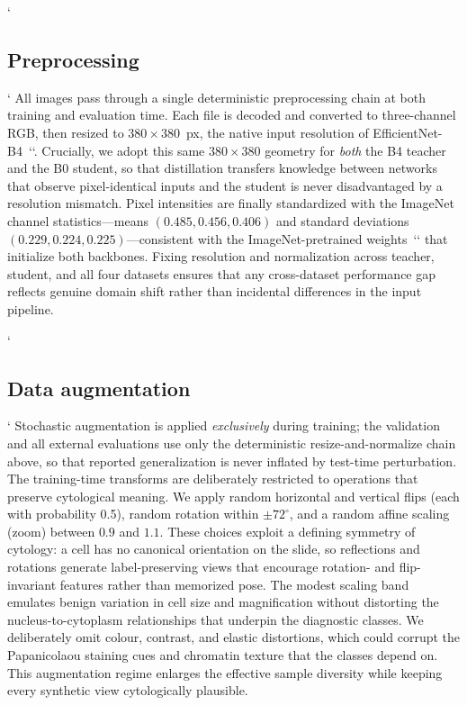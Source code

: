 `\subsection{Preprocessing}`
All images pass through a single deterministic preprocessing chain at both training and evaluation time. Each file is decoded and converted to three-channel RGB, then resized to $380\times380$~px, the native input resolution of EfficientNet-B4~`\citep{tan2019efficientnet}`. Crucially, we adopt this same $380\times380$ geometry for \emph{both} the B4 teacher and the B0 student, so that distillation transfers knowledge between networks that observe pixel-identical inputs and the student is never disadvantaged by a resolution mismatch. Pixel intensities are finally standardized with the ImageNet channel statistics---means $(0.485, 0.456, 0.406)$ and standard deviations $(0.229, 0.224, 0.225)$---consistent with the ImageNet-pretrained weights~`\citep{deng2009imagenet}` that initialize both backbones. Fixing resolution and normalization across teacher, student, and all four datasets ensures that any cross-dataset performance gap reflects genuine domain shift rather than incidental differences in the input pipeline.

`\subsection{Data augmentation}`
Stochastic augmentation is applied \emph{exclusively} during training; the validation and all external evaluations use only the deterministic resize-and-normalize chain above, so that reported generalization is never inflated by test-time perturbation. The training-time transforms are deliberately restricted to operations that preserve cytological meaning. We apply random horizontal and vertical flips (each with probability 0.5), random rotation within $\pm72^{\circ}$, and a random affine scaling (zoom) between $0.9$ and $1.1$. These choices exploit a defining symmetry of cytology: a cell has no canonical orientation on the slide, so reflections and rotations generate label-preserving views that encourage rotation- and flip-invariant features rather than memorized pose. The modest scaling band emulates benign variation in cell size and magnification without distorting the nucleus-to-cytoplasm relationships that underpin the diagnostic classes. We deliberately omit colour, contrast, and elastic distortions, which could corrupt the Papanicolaou staining cues and chromatin texture that the classes depend on. This augmentation regime enlarges the effective sample diversity while keeping every synthetic view cytologically plausible.